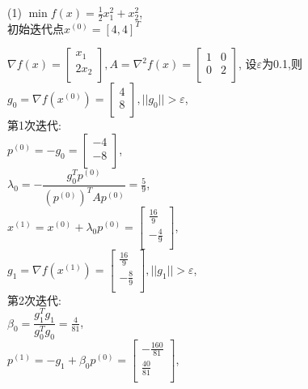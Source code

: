 \begin{problem}{(1)}
    $\min f(x)=\frac{1}{2}x_1^2+x_2^2$,\\
    初始迭代点${x^{(0)}}=[4,4]^T$
\end{problem}
\begin{solution}
    $\nabla f(x)=\begin{bmatrix}
        x_1  \\
        2x_2  \\
    \end{bmatrix}, A=\nabla^2 f(x)=\begin{bmatrix}
        1  & 0  \\
        0  & 2  \\
    \end{bmatrix}$,
    设$\varepsilon$为0.1,则\\
    $g_0=\nabla f(x^{(0)})=\begin{bmatrix} 4\\8\\\end{bmatrix},||g_0||>\varepsilon$,\\
    第1次迭代:\\
    $p^{(0)}=-g_0=\begin{bmatrix} -4\\-8\\\end{bmatrix}$,\\
    $\lambda_0=-\dfrac{g_0^Tp^{(0)}}{(p^{(0)})^TAp^{(0)}}=\frac{5}{9}$,\\
    $x^{(1)}=x^{(0)}+\lambda_0p^{(0)}=\begin{bmatrix} \frac{16}{9}\\-\frac{4}{9}\\\end{bmatrix}$,\\
    $g_1=\nabla f(x^{(1)})=\begin{bmatrix} \frac{16}{9}\\-\frac{8}{9}\\\end{bmatrix},||g_1||>\varepsilon$,\\
    第2次迭代:\\
    $\beta_0=\dfrac{g_1^Tg_1}{g_0^Tg_0}=\frac{4}{81}$,\\
    $p^{(1)}=-g_1+\beta_0p^{(0)}=\begin{bmatrix} -\frac{160}{81}\\\frac{40}{81}\\\end{bmatrix}$,\\

\end{solution}
